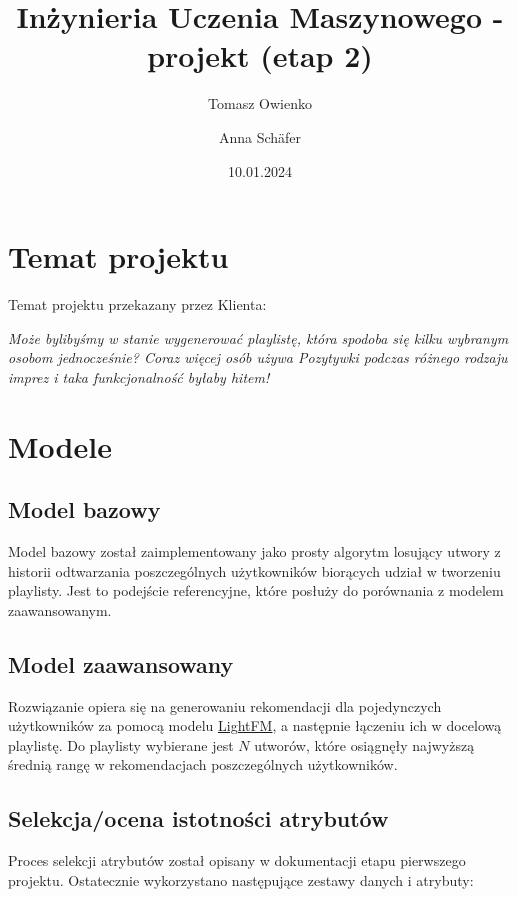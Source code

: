 \documentclass[10pt,a4paper]{article}
\title{Inżynieria Uczenia Maszynowego - projekt (etap 2)}
\author{Tomasz Owienko \and Anna Schäfer}
\date{10.01.2024}
\begin{document}
\maketitle

\section{Temat projektu}




Temat projektu przekazany przez Klienta:

\begin{displayquote}
	\textit{Może bylibyśmy w stanie wygenerować playlistę, która spodoba się kilku wybranym osobom jednocześnie? Coraz więcej osób używa Pozytywki podczas różnego rodzaju imprez i taka funkcjonalność byłaby hitem!}
\end{displayquote}


\section{Modele}


\subsection*{Model bazowy}
Model bazowy został zaimplementowany jako prosty algorytm losujący utwory z historii odtwarzania poszczególnych użytkowników biorących udział w tworzeniu playlisty. Jest to podejście referencyjne, które posłuży do porównania z modelem zaawansowanym.

\subsection*{Model zaawansowany}
  Rozwiązanie opiera się na generowaniu rekomendacji dla pojedynczych użytkowników za pomocą modelu \href{https://arxiv.org/pdf/1507.08439.pdf}{LightFM}, a następnie łączeniu ich w docelową playlistę. Do playlisty wybierane jest $N$ utworów, które osiągnęły najwyższą średnią rangę w rekomendacjach poszczególnych użytkowników.

\subsection*{Selekcja/ocena istotności atrybutów}

Proces selekcji atrybutów został opisany w dokumentacji etapu pierwszego projektu. Ostatecznie wykorzystano następujące zestawy danych i atrybuty:
 
\end{document}
